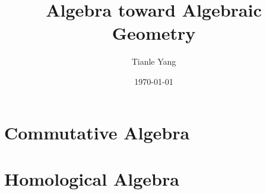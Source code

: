 \documentclass[sectionlevel=book]{noteformyself}
\title{Algebra toward Algebraic Geometry}
\author{Tianle Yang}
\date{\today}
\begin{document}
    \maketitle

    \tableofcontents %

    \chapter{Commutative Algebra}
        
        
        
        
        
        

    \chapter{Homological Algebra}
        
        
        



    \printbibliography[heading=bibintoc, title={References}] %
\end{document}

